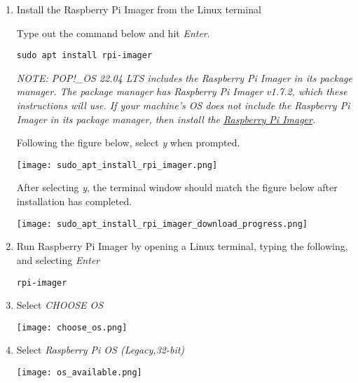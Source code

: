 \documentclass[journal]{IEEEtran}
\begin{document}
    \begin{enumerate}    
        \item Install the Raspberry Pi Imager from the Linux terminal \newline
        
        Type out the command below and hit \emph{Enter}. \newline

        \begin{lstlisting}[frame=single]
            sudo apt install rpi-imager
        \end{lstlisting}

        \emph{NOTE: POP!\_OS 22.04 LTS includes the Raspberry Pi Imager in its package manager. The package manager has Raspberry Pi Imager v1.7.2, which these instructions will use. If your machine's OS does not include the Raspberry Pi Imager in its package manager, then install the {\href{https://www.raspberrypi.com/software/}{Raspberry Pi Imager}}.} \newline

        Following the figure below, select \emph{y} when prompted. \newline

        \texttt{[image: sudo\_apt\_install\_rpi\_imager.png]}

        After selecting \emph{y}, the terminal window should match the figure below after installation has completed. \newline

        \texttt{[image: sudo\_apt\_install\_rpi\_imager\_download\_progress.png]}

        \item Run Raspberry Pi Imager by opening a Linux terminal, typing the following, and selecting \emph{Enter}
        
        \begin{lstlisting}[frame=single]
            rpi-imager
        \end{lstlisting}

        \item Select \emph{CHOOSE OS}

        \texttt{[image: choose\_os.png]}
        
        \item Select \emph{Raspberry Pi OS (Legacy,32-bit)}
        
        \texttt{[image: os\_available.png]} \newline


\end{enumerate}
\end{document}
